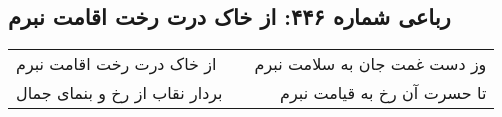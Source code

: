 \begin{center}
\section*{رباعی شماره ۴۴۶: از خاک درت رخت اقامت نبرم}
\label{sec:sh446}
\begin{longtable}{l p{0.5cm} r}
از خاک درت رخت اقامت نبرم
&&
وز دست غمت جان به سلامت نبرم
\\
بردار نقاب از رخ و بنمای جمال
&&
تا حسرت آن رخ به قیامت نبرم
\\
\end{longtable}
\end{center}
